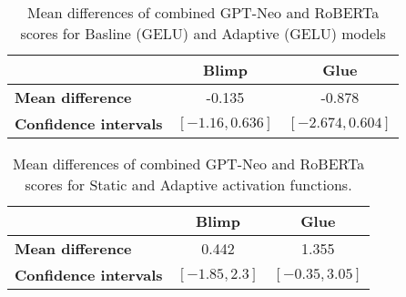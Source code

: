 \begin{table}[h]
    \centering
    \begin{tabular}{|l|c|c|}
    \hline
     & \textbf{Blimp} & \textbf{Glue} \\ \hline
    \textbf{Mean difference} & -0.135 & -0.878 \\ \hline
    \textbf{Confidence intervals} & $[-1.16, 0.636]$ & $[-2.674, 0.604]$ \\ \hline
    \end{tabular}
    \caption{Mean differences of combined GPT-Neo and RoBERTa scores for Basline (GELU) and Adaptive (GELU) models}
    \label{tab:comparison}
\end{table}

\begin{table}[h]
    \centering
    \begin{tabular}{|l|c|c|}
    \hline
     & \textbf{Blimp} & \textbf{Glue} \\ \hline
    \textbf{Mean difference} & 0.442 & 1.355 \\ \hline
    \textbf{Confidence intervals} & $[-1.85,  2.3]$ & $[-0.35,  3.05]$ \\ \hline
    \end{tabular}
    \caption{Mean differences of combined GPT-Neo and RoBERTa scores for Static and Adaptive activation functions.}
    \label{tab:comparison-static-adaptive}
\end{table}

